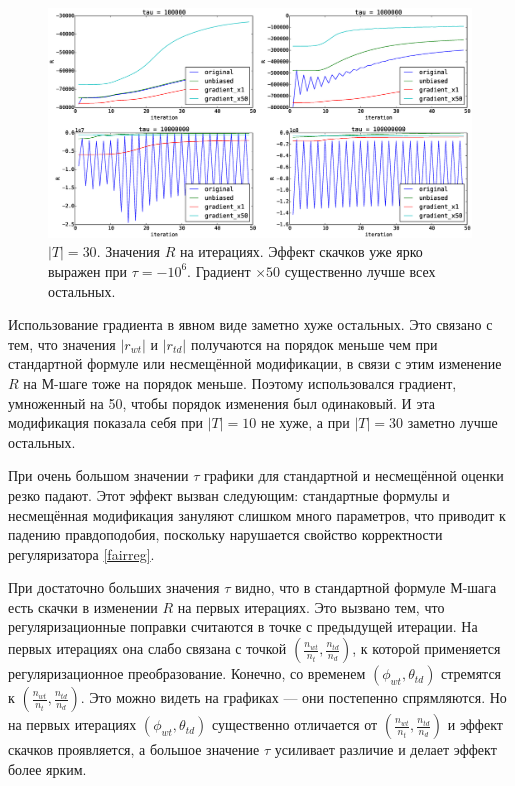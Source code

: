 \documentclass[12pt, twoside]{article}
\begin{document}
\begin{figure}[!ht]
	\centering  
	\includegraphics[width=1.0\linewidth]{paper_pictures/topics_30_R_values}
	\caption{$|T| = 30$. Значения $R$ на итерациях.  Эффект скачков уже ярко выражен при $\tau = -10^6$. Градиент $\times 50$ существенно лучше всех остальных.}  
\end{figure}

Использование градиента в явном виде заметно хуже остальных. Это связано с тем, что значения $|r_{wt}|$ и $|r_{td}|$ получаются на порядок меньше чем при стандартной формуле или несмещённой модификации, в связи с этим изменение $R$ на М-шаге тоже на порядок меньше. Поэтому использовался градиент, умноженный на 50, чтобы порядок изменения был одинаковый. И эта модификация показала себя при $|T| = 10$ не хуже, а при $|T| = 30$ заметно лучше остальных.

При очень большом значении $\tau$ графики для стандартной и несмещённой оценки резко падают. Этот эффект вызван следующим: стандартные формулы и несмещённая модификация зануляют слишком много параметров, что приводит к падению правдоподобия, поскольку нарушается свойство корректности регуляризатора \ref{fairreg}.

При достаточно больших значения $\tau$ видно, что в стандартной  формуле М-шага есть скачки в изменении $R$ на первых итерациях. Это вызвано тем, что регуляризационные поправки считаются в точке с предыдущей итерации. На первых итерациях  она слабо связана с точкой $\left( \frac{n_{wt}}{{n_t}}, \frac{n_{td}}{n_d}\right)$, к которой применяется регуляризационное преобразование. Конечно, со временем $(\phi_{wt}, \theta_{td})$ стремятся к $\left( \frac{n_{wt}}{{n_t}}, \frac{n_{td}}{n_d}\right)$. Это можно видеть на графиках --- они постепенно спрямляются. Но на первых итерациях $(\phi_{wt}, \theta_{td})$ существенно отличается  от $\left( \frac{n_{wt}}{{n_t}}, \frac{n_{td}}{n_d}\right)$  и эффект скачков  проявляется, а большое значение $\tau$ усиливает различие и делает эффект более ярким.
\end{document}
